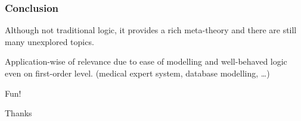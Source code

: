 \documentclass[aspectratio=169]%
  {beamer}
\begin{document}
\begin{frame}
  \frametitle{Conclusion}
  Although not \alert{traditional} logic, it provides a rich meta-theory and
  there are still many unexplored topics.

  Application-wise of relevance due to ease of modelling and
  well-behaved logic even on first-order level. (medical expert
  system, database modelling, \ldots)


  \pause
  Fun!

  \pause
  \begin{center}
    \Large Thanks
  \end{center}
\end{frame}
\end{document}
